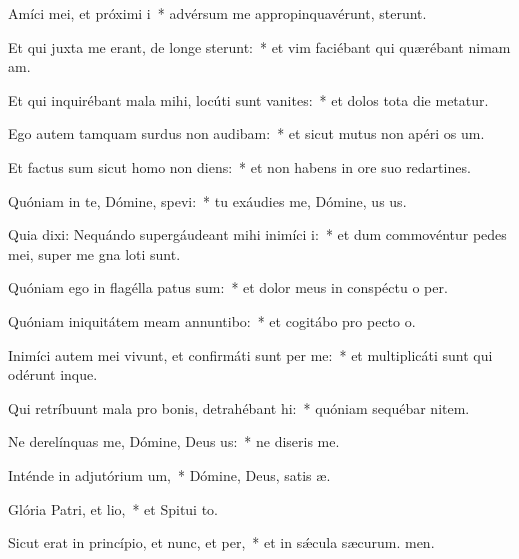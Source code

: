 \item Amíci mei, et próximi i~* advérsum me appropinquavérunt,  sterunt.
\item Et qui juxta me erant, de longe sterunt:~* et vim faciébant qui quærébant nimam am.
\item Et qui inquirébant mala mihi, locúti sunt vanites:~* et dolos tota die metatur.
\item Ego autem tamquam surdus non audibam:~* et sicut mutus non apéri os um.
\item Et factus sum sicut homo non diens:~* et non habens in ore suo redartines.
\item Quóniam in te, Dómine, spevi:~* tu exáudies me, Dómine, us us.
\item Quia dixi: Nequándo supergáudeant mihi inimíci i:~* et dum commovéntur pedes mei, super me gna loti sunt.
\item Quóniam ego in flagélla patus sum:~* et dolor meus in conspéctu o per.
\item Quóniam iniquitátem meam annuntibo:~* et cogitábo pro pecto o.
\item Inimíci autem mei vivunt, et confirmáti sunt per me:~* et multiplicáti sunt qui odérunt  inque.
\item Qui retríbuunt mala pro bonis, detrahébant hi:~* quóniam sequébar nitem.
\item Ne derelínquas me, Dómine, Deus us:~* ne diseris  me.
\item Inténde in adjutórium um,~* Dómine, Deus, satis æ.
\item Glória Patri, et lio,~* et Spitui to.
\item Sicut erat in princípio, et nunc, et per,~* et in sǽcula sæcurum. men.
